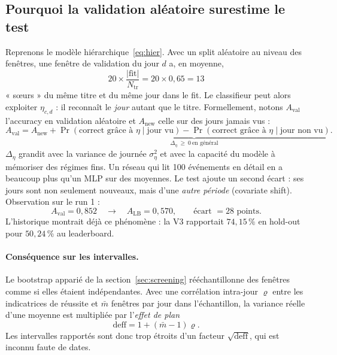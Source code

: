 \subsection{Pourquoi la validation aléatoire surestime le test}\label{sec:dependance}
Reprenons le modèle hiérarchique~\eqref{eq:hier}. Avec un split aléatoire au niveau des fenêtres, une fenêtre de validation du jour $d$ a, en moyenne,
\begin{equation}
20\times\frac{|\text{fit}|}{N_{\text{tr}}}=20\times0{,}65=13
\end{equation}
« sœurs » du même titre et du même jour dans le fit. Le classifieur peut alors exploiter $\eta_{c,d}$ : il reconnaît le \emph{jour} autant que le titre. Formellement, notons $A_{\text{val}}$ l'accuracy en validation aléatoire et $A_{\text{new}}$ celle sur des jours jamais vus :
\begin{equation}
A_{\text{val}}=A_{\text{new}}+\underbrace{\Pr(\text{correct grâce à }\eta\mid\text{jour vu})-\Pr(\text{correct grâce à }\eta\mid\text{jour non vu})}_{\Delta_\eta\ \ge\ 0\ \text{en général}} .
\end{equation}
$\Delta_\eta$ grandit avec la variance de journée $\sigma^2_\eta$ et avec la capacité du modèle à mémoriser des régimes fins. Un réseau qui lit 100 événements en détail en a beaucoup plus qu'un MLP sur des moyennes. Le test ajoute un second écart : ses jours sont non seulement nouveaux, mais d'une \emph{autre période} (covariate shift). Observation sur le run 1 :
\begin{equation}
A_{\text{val}}=0{,}852\quad\longrightarrow\quad A_{\text{LB}}=0{,}570,\qquad\text{écart }=28\text{ points.}
\end{equation}
L'historique montrait déjà ce phénomène : la V3 rapportait $74{,}15\,\%$ en hold-out pour $50{,}24\,\%$ au leaderboard.

\paragraph{Conséquence sur les intervalles.} Le bootstrap apparié de la section~\ref{sec:screening} rééchantillonne des fenêtres comme si elles étaient indépendantes. Avec une corrélation intra-jour $\varrho$ entre les indicatrices de réussite et $\bar m$ fenêtres par jour dans l'échantillon, la variance réelle d'une moyenne est multipliée par l'\emph{effet de plan}
\begin{equation}
\mathrm{deff}=1+(\bar m-1)\varrho .
\end{equation}
Les intervalles rapportés sont donc trop étroits d'un facteur $\sqrt{\mathrm{deff}}$, qui est inconnu faute de dates.

